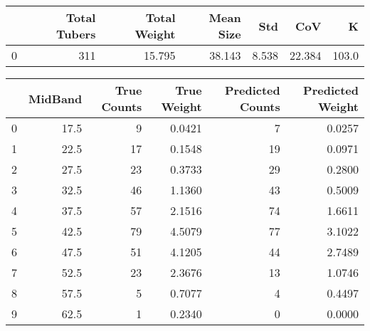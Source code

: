 \begin{tabular}{lrrrrrr}
\toprule
{} &  Total Tubers &  Total Weight &  Mean Size &    Std &     CoV &      K \\
\midrule
0 &           311 &        15.795 &     38.143 &  8.538 &  22.384 &  103.0 \\
\bottomrule
\end{tabular}

\begin{tabular}{lrrrrr}
\toprule
{} &  MidBand &  True Counts &  True Weight &  Predicted Counts &  Predicted Weight \\
\midrule
0 &     17.5 &            9 &       0.0421 &                 7 &            0.0257 \\
1 &     22.5 &           17 &       0.1548 &                19 &            0.0971 \\
2 &     27.5 &           23 &       0.3733 &                29 &            0.2800 \\
3 &     32.5 &           46 &       1.1360 &                43 &            0.5009 \\
4 &     37.5 &           57 &       2.1516 &                74 &            1.6611 \\
5 &     42.5 &           79 &       4.5079 &                77 &            3.1022 \\
6 &     47.5 &           51 &       4.1205 &                44 &            2.7489 \\
7 &     52.5 &           23 &       2.3676 &                13 &            1.0746 \\
8 &     57.5 &            5 &       0.7077 &                 4 &            0.4497 \\
9 &     62.5 &            1 &       0.2340 &                 0 &            0.0000 \\
\bottomrule
\end{tabular}
